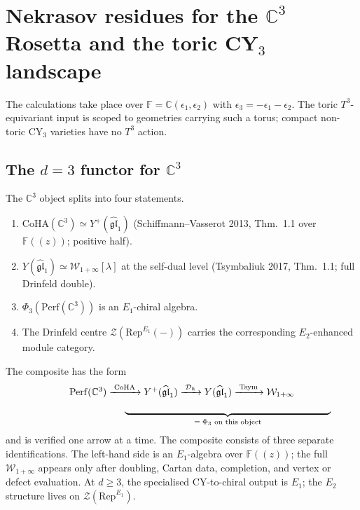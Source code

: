 \section{Nekrasov residues for the $\mathbb C^3$ Rosetta and the toric CY$_3$ landscape}
\label{wn:c3-rosetta-nekrasov}

\providecommand{\Wilpha}{\mathcal{W}_{1+\infty}}
\providecommand{\gghone}{\widehat{\mathfrak{gl}}_1}
\providecommand{\CoHA}{\mathrm{CoHA}}
\providecommand{\Hilb}{\mathrm{Hilb}}
\providecommand{\Eone}{E_1}
\providecommand{\Etwo}{E_2}
\providecommand{\hCS}{\mathrm{hCS}}

The calculations take place over
$\mathbb F=\mathbb C(\epsilon_1,\epsilon_2)$ with
$\epsilon_3=-\epsilon_1-\epsilon_2$. The toric
$T^3$-equivariant input is scoped to geometries carrying such a torus;
compact non-toric CY$_3$ varieties have no $T^3$ action.

\subsection*{The $d=3$ functor for $\mathbb C^3$}

The $\mathbb C^3$ object splits into four statements.
\begin{enumerate}
\item $\CoHA(\mathbb C^3)\simeq Y^+(\gghone)$
    (Schiffmann--Vasserot 2013, Thm.\ 1.1 over
    $\mathbb F(\!(z)\!)$; positive half).
\item $Y(\gghone)\simeq\Wilpha[\lambda]$ at the self-dual level
    (Tsymbaliuk 2017, Thm.\ 1.1; full Drinfeld double).
\item $\Phi_3(\mathrm{Perf}(\mathbb C^3))$ is an $E_1$-chiral
    algebra.
\item The Drinfeld centre
    $\mathcal Z(\mathrm{Rep}^{\Eone}(-))$ carries the corresponding
    $\Etwo$-enhanced module category.
\end{enumerate}

The composite has the form
\[
\begin{array}{c}
\mathrm{Perf}(\mathbb C^3)
  \xrightarrow{\;\CoHA\;}
Y^+(\gghone)
  \xrightarrow{\;\mathcal D_\hbar\;}
Y(\gghone)
  \xrightarrow{\;\mathrm{Tsym}\;}
\Wilpha \\[4pt]
\hspace{3.3cm}\underbrace{\hspace{7.4cm}}_{=\;\Phi_3\text{ on this object}}
\end{array}
\]
and is verified one arrow at a time. The composite consists of three
separate identifications. The left-hand side is an $\Eone$-algebra over
$\mathbb F(\!(z)\!)$; the full $\Wilpha$ appears only after doubling,
Cartan data, completion, and vertex or defect evaluation. At $d\ge3$,
the specialised CY-to-chiral output is $\Eone$; the $\Etwo$ structure
lives on $\mathcal Z(\mathrm{Rep}^{\Eone})$.

